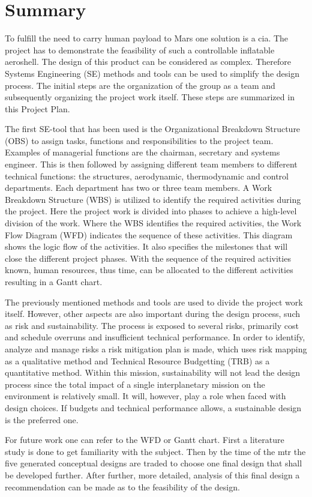 \section*{Summary}\label{cha:summary}
To fulfill the need to carry human payload to Mars one solution is a \gls{cia}. The project has to demonstrate the feasibility of such a controllable inflatable aeroshell. The design of this product can be considered as complex. Therefore Systems Engineering (SE) methods and tools can be used to simplify the design process. The initial steps are the organization of the group as a team and subsequently organizing the project work itself. These steps are summarized in this Project Plan.

The first SE-tool that has been used is the Organizational Breakdown Structure (OBS) to assign tasks, functions and responsibilities to the project team. Examples of managerial functions are the chairman, secretary and systems engineer. This is then followed by assigning different team members to different technical functions: the structures, aerodynamic, thermodynamic and control departments. Each department has two or three team members. A Work Breakdown Structure (WBS) is utilized to identify the required activities during the project. Here the project work is divided into phases to achieve a high-level division of the work. Where the WBS identifies the required activities, the Work Flow Diagram (WFD) indicates the sequence of these activities. This diagram shows the logic flow of the activities. It also specifies the milestones that will close the different project phases. With the sequence of the required activities known, human resources, thus time, can be allocated to the different activities resulting in a Gantt chart. 

The previously mentioned methods and tools are used to divide the project work itself. However, other aspects are also important during the design process, such as risk and sustainability. The process is exposed to several risks, primarily cost and schedule overruns and insufficient technical performance. In order to identify, analyze and manage risks a risk mitigation plan is made, which uses risk mapping as a qualitative method and Technical Resource Budgetting (TRB) as a quantitative method. Within this mission, sustainability will not lead the design process since the total impact of a single interplanetary mission on the environment is relatively small. It will, however, play a role when faced with design choices. If budgets and technical performance allows, a sustainable design is the preferred one.

For future work one can refer to the WFD or Gantt chart. First a literature study is done to get familiarity with the subject. Then by the time of the \gls{mtr} the five generated conceptual designs are traded to choose one final design that shall be developed further. After further, more detailed, analysis of this final design a recommendation can be made as to the feasibility of the design.

